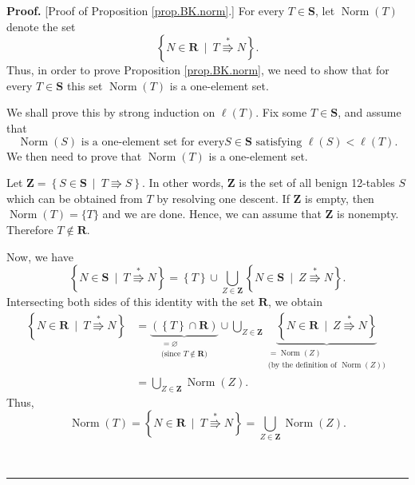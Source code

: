\documentclass[numbers=enddot,12pt,final,onecolumn,notitlepage]{scrartcl}%
\theoremstyle{definition}
\newenvironment{proof}[1][Proof]{\noindent\textbf{#1.} }{\ \rule{0.5em}{0.5em}}
\begin{document}
\begin{proof}
[Proof of Proposition \ref{prop.BK.norm}.] For every $T\in\mathbf{S}$, let
$\operatorname*{Norm}\left(  T\right)  $ denote the set%
\[
\left\{  N\in\mathbf{R}\ \mid\ T\overset{\ast}{\Rrightarrow}N\right\}  .
\]
Thus, in order to prove Proposition \ref{prop.BK.norm}, we need to show that for every $T\in\mathbf{S}$ this set $\operatorname*{Norm}%
\left(  T\right)  $ is a one-element set.

We shall prove this by strong induction on $\ell\left(  T\right)  $. Fix
some $T\in\mathbf{S}$, and assume that
\begin{equation}
\operatorname*{Norm}\left(  S\right)  \text{ is a one-element set for every
}S\in\mathbf{S}\text{ satisfying }\ell\left(  S\right)  <\ell\left(  T\right)
\text{.}\label{pf.prop.BK.norm.indhyp}%
\end{equation}
We then need to prove that $\operatorname*{Norm}\left(  T\right)  $ is a
one-element set.

Let $\mathbf{Z} = \left\{  S\in\mathbf{S}\ \mid\ T\Rrightarrow
S\right\}  $. In other words, $\mathbf{Z}$ is the set of all benign 12-tables
$S$ which can be obtained from $T$ by resolving one descent. If
$\mathbf{Z}$ is empty, then $\operatorname*{Norm}\left(  T\right) = \{T\}$ and we are done. Hence, we can
assume that $\mathbf{Z}$ is nonempty. Therefore $T \notin \mathbf{R}$.

Now, we have
\[
\left\{  N\in\mathbf{S}\ \mid\ T\overset{\ast}{\Rrightarrow}N\right\}
=\left\{  T\right\}  \cup\bigcup_{Z\in\mathbf{Z}}\left\{  N\in\mathbf{S}%
\ \mid\ Z\overset{\ast}{\Rrightarrow}N\right\}  .
\]
Intersecting both sides of this identity with the set $\mathbf{R}$, we obtain%
\begin{align*}
\left\{  N\in\mathbf{R}\ \mid\ T\overset{\ast}{\Rrightarrow}N\right\}    &
=\underbrace{\left(  \left\{  T\right\}  \cap\mathbf{R}\right)  }%
_{\substack{=\varnothing\\\text{(since }T\notin\mathbf{R}\text{)}}}\cup
\bigcup_{Z\in\mathbf{Z}}\underbrace{\left\{  N\in\mathbf{R}\ \mid
\ Z\overset{\ast}{\Rrightarrow}N\right\}  }_{\substack{=\operatorname*{Norm}%
\left(  Z\right)  \\\text{(by the definition of }\operatorname*{Norm}\left(
Z\right)  \text{)}}}\\
& =\bigcup_{Z\in\mathbf{Z}}\operatorname*{Norm}\left(  Z\right)  .
\end{align*}
Thus,
\begin{equation}
\operatorname*{Norm}\left(  T\right)  =\left\{  N\in\mathbf{R}\ \mid
\ T\overset{\ast}{\Rrightarrow}N\right\}  =\bigcup_{Z\in\mathbf{Z}%
}\operatorname*{Norm}\left(  Z\right)  .\label{pf.prop.BK.norm.union}%
\end{equation}



\end{proof}
\end{document}
